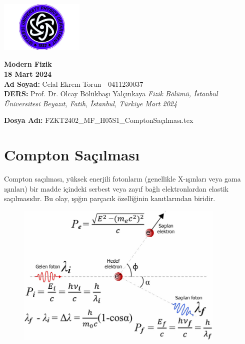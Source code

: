 \documentclass[11pt,letterpaper]{fenbil}
\begin{document}
\begin{minipage}{0.15\textwidth}
{
\includegraphics[width=4cm]{logo/iufizik.png}
}
\end{minipage}
\hspace{25pt}
\begin{minipage}{0.75\textwidth}
\vspace{5mm}
\Large{\textbf{Modern Fizik \\ 18 Mart 2024}}
\vspace{3mm}\\
\large{\textbf{Ad Soyad:} Celal Ekrem Torun - 0411230037}
\vspace{2mm}\\
\large{\textbf{DERS:} Prof. Dr. Olcay Bölükbaşı Yalçınkaya}\newline
\fontsize{0.35cm}{0.5cm}\selectfont
\textit{Fizik Bölümü, İstanbul Üniversitesi\newline
Beyazıt, Fatih, İstanbul, Türkiye Mart 2024}
\end{minipage}
\small

\begin{center}
\textbf{Dosya Adı:} FZKT2402\_MF\_H05S1\_ComptonSaçılması.tex
\end{center}

\hspace{25pt}
\hspace{25pt}
\hspace{25pt}
\section{Compton Saçılması}

Compton saçılması, yüksek enerjili fotonların (genellikle X-ışınları veya gama ışınları) bir madde içindeki serbest veya zayıf bağlı elektronlardan elastik saçılmasıdır. Bu olay, ışığın parçacık özelliğinin kanıtlarından biridir.

\begin{figure}[H]
{
\includegraphics[width=10cm]{compton_efekti.jpg}
}
\end{figure}
\end{document}
